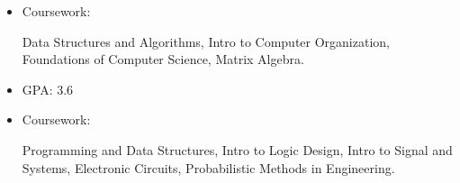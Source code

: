 \newcommand{\TUBentry}{
    \TUB
    \poswithprd{Introduction to 3D Scanning and Printing at TUB Winter University}{Jan 2018-Feb 2018}
    \begin{itemize}
        \item 
        Learned the basic of 3D scanning \& printing. Learned Blender for 3D modeling.
    \end{itemize}
}



\UM
{}
\begin{itemize}
    \item Coursework: 
    \begin{minipage}[t]{\courseworkwidth}
        Data Structures and Algorithms,
        Intro to Computer Organization,
        Foundations of Computer Science,
        Matrix Algebra.
    \end{minipage}
\end{itemize}

\JI
{}
\begin{itemize}
    \item GPA: 3.6
    \item Coursework:
    \begin{minipage}[t]{\courseworkwidth}
        Programming and Data Structures,
        Intro to Logic Design,
        Intro to Signal and Systems,
        Electronic Circuits,
        Probabilistic Methods in Engineering.
    \end{minipage}
\end{itemize}